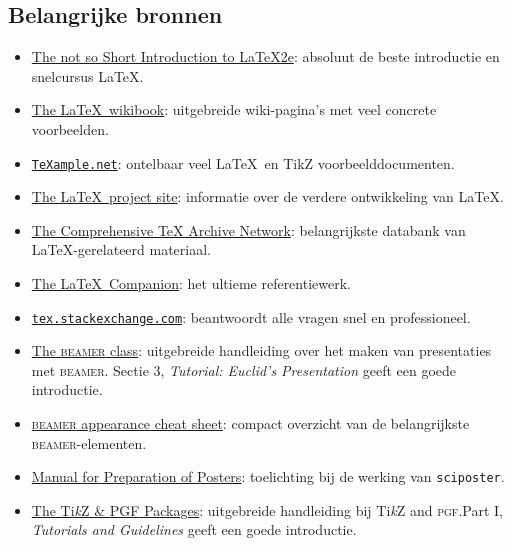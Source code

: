 \documentclass[kulak]{kulakarticle} %
\begin{document}
\subsection{Belangrijke bronnen}

\begin{itemize}
	\item \href{http://mirrors.ctan.org/info/lshort/english/lshort.pdf}{The not so Short Introduction to \LaTeX2e}: absoluut de beste introductie en snelcursus \LaTeX.
	\item \href{http://en.wikibooks.org/wiki/LaTeX}{The \LaTeX\ wikibook}: uitgebreide wiki-pagina's met veel concrete voorbeelden.
	\item \href{http://www.texample.net/}{\texttt{TeXample.net}}: ontelbaar veel \LaTeX\ en TikZ voorbeelddocumenten.
	\item \href{http://www.latex-project.org/}{The \LaTeX\ project site}: informatie over de verdere ontwikkeling van \LaTeX.
	\item \href{http://www.ctan.org/}{The Comprehensive TeX Archive Network}: belangrijkste databank van \LaTeX-gerelateerd materiaal.
	\item \href{https://www.researchgate.net/publication/378520971_The_LaTeX_Companion_Parts_I_II_3rd_Edition}{The \LaTeX\ Companion}: het ultieme referentiewerk.
	\item \href{https://tex.stackexchange.com/}{\texttt{tex.stackexchange.com}}: beantwoordt alle vragen snel en professioneel.
	\item \href{http://mirrors.ctan.org/macros/latex/contrib/beamer/doc/beameruserguide.pdf}{The \textsc{beamer} class}: uitgebreide handleiding over het maken van  presentaties met \textsc{beamer}. \newline Sectie 3, \emph{Tutorial: Euclid’s Presentation} geeft een goede introductie.
	\item \href{https://www.cpt.univ-mrs.fr/~masson/latex/Beamer-appearance-cheat-sheet.pdf}{\textsc{beamer} appearance cheat sheet}: compact overzicht van de belangrijkste \textsc{beamer}-elementen.
	\item \href{http://mirrors.ctan.org/macros/latex/contrib/sciposter/scipostermanual.pdf}{Manual for Preparation of Posters}: toelichting bij de werking van \texttt{sciposter}.
	\item \href{https://mirror.lyrahosting.com/CTAN/graphics/pgf/base/doc/pgfmanual.pdf}{The Ti\emph{k}Z \& \textsc{PGF} Packages}: uitgebreide handleiding bij Ti\emph{k}Z and \textsc{pgf}.\newline Part I, \emph{Tutorials and Guidelines} geeft een goede introductie.
\end{itemize}
\end{document}
